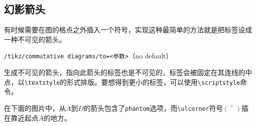 \documentclass{ctexart}
\begin{document}
\subsection{幻影箭头}
有时候需要在图的格点之外插入一个符号，实现这种最简单的方法就是把标签设成一种不可见的箭头。
\par{\color{red}\texttt{/tikz/commutative diagrams/to=<参数>}}\hfill （no default）\par
生成不可见的箭头，指向此箭头的标签也是不可见的，标签会被固定在其连线的中点，以\verb|\textstyle|的形式排版。要想得到更小的标签，可以使用\verb|\scriptstyle|命令。
\par 在下面的图片中，从$A$到$D$的箭头包含了\verb|phantom|选项，而\verb|\ulcorner|符号$(\ulcorner)$插在靠近起点$A$的地方。
\begin{tcblisting}{}
\end{tcblisting}
\end{document}
